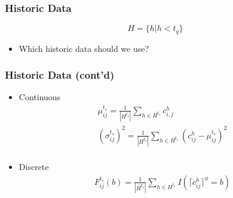 \documentclass[t]{beamer}
\begin{document}
\begin{frame}\frametitle{Historic Data}
\begin{equation*}
H = \{h | h < t_q\}
\end{equation*}

\begin{itemize}
\item Which historic data should we use?
\end{itemize}
\vspace{0.25in}
\end{frame}

\begin{frame}\frametitle{Historic Data \small{(cont'd)}}
\begin{itemize}
\item Continuous
\begin{gather*}
	\mu_{ij}^{t_s} = \frac{1}{|H^{t_s}|}\sum_{h\in H^{t_s}} c_{i,j}^h\\ 
	(\sigma_{ij}^{t_s})^2 = \frac{1}{|H^{t_s}|}\sum_{h\in H^{t_s}} (c_{ij}^h-\mu_{ij}^{t_s})^2\\
\end{gather*}
\item Discrete
\begin{gather*}
  F_{ij}^{t_s}(b) = \frac{1}{|H^{t_s}|}\sum_{h\in H^{t_s}} I(\lceil c_{ij}^h \rceil^\phi= b)
\end{gather*}
\end{itemize}
\end{frame}
\end{document}
